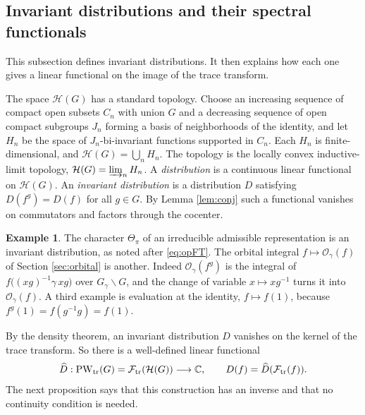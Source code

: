 \documentclass[12pt,letterpaper]{amsart}
\numberwithin{equation}{section}
\theoremstyle{definition}
\newtheorem*{example*}{Example}
\theoremstyle{remark}
\newcommand{\calH}{\mathcal H}
\newcommand{\PW}{\operatorname{PW}}
\begin{document}
\subsection{Invariant distributions and their spectral functionals}
This subsection defines invariant distributions. It then explains how each one gives a linear functional on the image of the trace transform.

The space $\calH(G)$ has a standard topology. Choose an increasing sequence of compact open subsets $C_n$ with union $G$ and a decreasing sequence of open compact subgroups $J_n$ forming a basis of neighborhoods of the identity, and let $H_n$ be the space of $J_n$-bi-invariant functions supported in $C_n$. Each $H_n$ is finite-dimensional, and $\calH(G)=\bigcup_nH_n$. The topology is the locally convex inductive-limit topology, $\calH(G)=\varinjlim_nH_n$. A \emph{distribution} is a continuous linear functional on $\calH(G)$. An \emph{invariant distribution} is a distribution $D$ satisfying $D(f^g)=D(f)$ for all $g\in G$. By Lemma \ref{lem:conj} such a functional vanishes on commutators and factors through the cocenter.
\begin{example*}
The character $\Theta_\pi$ of an irreducible admissible representation is an invariant distribution, as noted after \eqref{eq:opFT}. The orbital integral $f\mapsto\mathcal O_\gamma(f)$ of Section \ref{sec:orbital} is another. Indeed $\mathcal O_\gamma(f^g)$ is the integral of $f\bigl((xg)^{-1}\gamma\,xg\bigr)$ over $G_\gamma\backslash G$, and the change of variable $x\mapsto xg^{-1}$ turns it into $\mathcal O_\gamma(f)$. A third example is evaluation at the identity, $f\mapsto f(1)$, because $f^g(1)=f(g^{-1}g)=f(1)$.
\end{example*}
By the density theorem, an invariant distribution $D$ vanishes on the kernel of the trace transform. So there is a well-defined linear functional
\begin{equation}\label{eq:distribution-factor}
\widehat D:\PW_{\rm tr}(G)=\mathcal F_{\rm tr}(\calH(G))\longrightarrow\mathbb C,
\qquad D(f)=\widehat D(\mathcal F_{\rm tr}(f)).
\end{equation}
The next proposition says that this construction has an inverse and that no continuity condition is needed.
\end{document}
